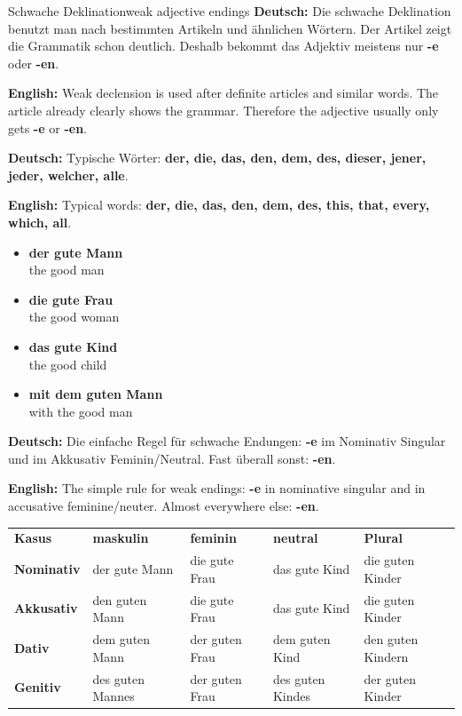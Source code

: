 \documentclass[a4paper,11pt]{article}
\newcommand{\GermanText}[1]{\textbf{Deutsch: }#1\par}
\newcommand{\EnglishText}[1]{{\small\color{SoftGray}\textbf{English: }#1\par}}
\newcommand{\ExampleItem}[2]{\item \textbf{#1}\\{\small\color{SoftGray}#2}}
\begin{document}
\begin{grammarentry}{Schwache Deklination}{weak adjective endings}
\GermanText{Die schwache Deklination benutzt man nach bestimmten Artikeln und ähnlichen Wörtern. Der Artikel zeigt die Grammatik schon deutlich. Deshalb bekommt das Adjektiv meistens nur \textbf{-e} oder \textbf{-en}.}
\EnglishText{Weak declension is used after definite articles and similar words. The article already clearly shows the grammar. Therefore the adjective usually only gets \textbf{-e} or \textbf{-en}.}

\GermanText{Typische Wörter: \textbf{der, die, das, den, dem, des, dieser, jener, jeder, welcher, alle}.}
\EnglishText{Typical words: \textbf{der, die, das, den, dem, des, this, that, every, which, all}.}

\begin{exbox}
\begin{itemize}
    \ExampleItem{der gute Mann}{the good man}
    \ExampleItem{die gute Frau}{the good woman}
    \ExampleItem{das gute Kind}{the good child}
    \ExampleItem{mit dem guten Mann}{with the good man}
\end{itemize}
\end{exbox}

\GermanText{Die einfache Regel für schwache Endungen: \textbf{-e} im Nominativ Singular und im Akkusativ Feminin/Neutral. Fast überall sonst: \textbf{-en}.}
\EnglishText{The simple rule for weak endings: \textbf{-e} in nominative singular and in accusative feminine/neuter. Almost everywhere else: \textbf{-en}.}
\end{grammarentry}

\begin{center}
\begin{tabular}{>{\bfseries}p{2.5cm}p{3cm}p{3cm}p{3cm}p{3cm}}
\rowcolor{HeaderBlueDark}
\color{white}\textbf{Kasus} & \color{white}\textbf{maskulin} & \color{white}\textbf{feminin} & \color{white}\textbf{neutral} & \color{white}\textbf{Plural} \\
Nominativ & der gute Mann & die gute Frau & das gute Kind & die guten Kinder \\
Akkusativ & den guten Mann & die gute Frau & das gute Kind & die guten Kinder \\
Dativ & dem guten Mann & der guten Frau & dem guten Kind & den guten Kindern \\
Genitiv & des guten Mannes & der guten Frau & des guten Kindes & der guten Kinder \\
\end{tabular}
\end{center}
\end{document}
